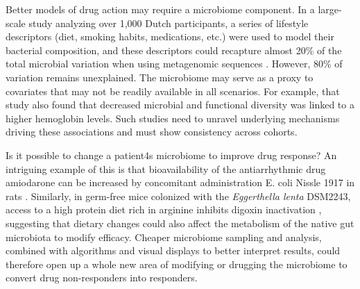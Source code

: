 Better models of drug action may require a microbiome component. In a large-scale study analyzing over 1,000 Dutch participants, a series of lifestyle descriptors (diet, smoking habits, medications, etc.) were used to model their bacterial composition, and these descriptors could recapture almost 20\% of the total microbial variation when using metagenomic sequences \cite{RN4059}. However, 80\% of variation remains unexplained. The microbiome may serve as a proxy to covariates that may not be readily available in all scenarios. For example, that study also found that decreased microbial and functional diversity was linked to a higher hemoglobin levels. Such studies need to unravel underlying mechanisms driving these associations and must show consistency across cohorts. 

Is it possible to change a patient4s microbiome to improve drug response?  An intriguing example of this is that bioavailability of the antiarrhythmic drug amiodarone can be increased by concomitant administration E. coli Nissle 1917 in rats \cite{RN4086, RN4201}. Similarly, in germ-free mice colonized with the \textit{Eggerthella lenta} DSM2243, access to a high protein diet rich in arginine inhibits digoxin inactivation \cite{RN4102, RN4202}, suggesting that dietary changes could also affect the metabolism of the native gut microbiota to modify efficacy. Cheaper microbiome sampling and analysis, combined with algorithms and visual displays to better interpret results, could therefore open up a whole new area of modifying or drugging the microbiome to convert drug non-responders into responders.

